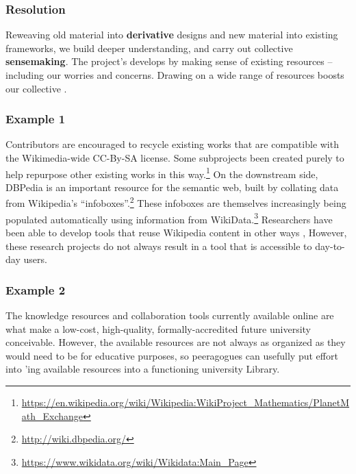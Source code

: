 \subsubsection*{Resolution} Reweaving old material into \textbf{derivative} designs and new material into existing frameworks, we build deeper understanding, and carry out collective \textbf{sensemaking}.
%
The project's  develops by making sense of existing resources -- including our worries and concerns.
Drawing on a wide range of resources boosts our collective .


\subsubsection*{Example 1}
Contributors are encouraged to recycle existing works that are compatible
with the Wikimedia-wide CC-By-SA license.
Some subprojects been created purely to help repurpose other existing works in this
way.\footnote{\url{https://en.wikipedia.org/wiki/Wikipedia:WikiProject_Mathematics/PlanetMath_Exchange}}
%
On the downstream side, DBPedia is an important resource for the
semantic web, built by collating data from Wikipedia's
``infoboxes''.\footnote{\url{http://wiki.dbpedia.org/}}
%
These infoboxes are themselves increasingly being populated
automatically using information from WikiData.\footnote{\url{https://www.wikidata.org/wiki/Wikidata:Main_Page}}
Researchers have been able to develop tools that reuse Wikipedia content in other ways \cite{reinhold2006wikitrails,riche2010ichase},
However, these research projects do not always result in a tool that
is accessible to day-to-day users.

\vspace{.05cm}

\subsubsection*{Example 2}
The knowledge resources and collaboration tools currently available online
are what make a low-cost, high-quality, formally-accredited future university
conceivable.  However, the available resources are not always as
organized as they would need to be for educative purposes, so peeragogues can usefully put
effort into 'ing available
resources into a functioning university Library.

